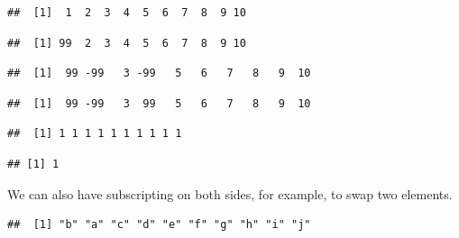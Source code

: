 \documentclass[krantz2]{krantz}\usepackage{knitr}
\begin{document}
\begin{knitrout}\footnotesize
{}\color{fgcolor}\begin{kframe}
\begin{alltt}
 \hlkwb{<-} \hlopt{:}
\end{alltt}
\begin{verbatim}
##  [1]  1  2  3  4  5  6  7  8  9 10
\end{verbatim}
\begin{alltt}
\hlstd{a[}\hlstd{]} \hlkwb{<-} 
\end{alltt}
\begin{verbatim}
##  [1] 99  2  3  4  5  6  7  8  9 10
\end{verbatim}
\begin{alltt}
\hlstd{a[}\hlstd{(}\hlstd{,}\hlstd{)]} \hlkwb{<-} \hlopt{-} 
\end{alltt}
\begin{verbatim}
##  [1]  99 -99   3 -99   5   6   7   8   9  10
\end{verbatim}
\begin{alltt}
\hlstd{a[}\hlstd{(}\hlstd{,}\hlstd{)]} \hlkwb{<-} \hlstd{(}\hlopt{-}\hlstd{,} \hlstd{)}
\end{alltt}
\begin{verbatim}
##  [1]  99 -99   3  99   5   6   7   8   9  10
\end{verbatim}
\begin{alltt}
\hlstd{a[}\hlstd{]} \hlkwb{<-} 
\end{alltt}
\begin{verbatim}
##  [1] 1 1 1 1 1 1 1 1 1 1
\end{verbatim}
\begin{alltt}
 \hlkwb{<-} 
\end{alltt}
\begin{verbatim}
## [1] 1
\end{verbatim}
\end{kframe}
\end{knitrout}

We can also have subscripting on both sides, for example, to swap two elements.

\begin{knitrout}\footnotesize
{}\color{fgcolor}\begin{kframe}
\begin{alltt}
 \hlkwb{<-} \hlstd{letters[}\hlopt{:}\hlstd{]}
\hlstd{a[}\hlopt{:}\hlstd{]} \hlkwb{<-} \hlstd{a[}\hlopt{:}\hlstd{]}
\end{alltt}
\begin{verbatim}
##  [1] "b" "a" "c" "d" "e" "f" "g" "h" "i" "j"
\end{verbatim}
\end{kframe}
\end{knitrout}
\end{document}
